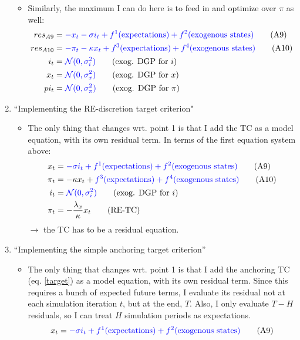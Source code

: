 \documentclass[11pt]{article}
\renewcommand{\[}{\begin{equation}}
\renewcommand{\]}{\end{equation}}
\begin{document}
\begin{enumerate}
\begin{itemize}
\item Similarly, the maximum I can do here is to feed in and optimize over $\pi$ as well:
\begin{align}
res_{A9}& = \textcolor{blue}{- x_t -\sigma i_t + f^1(\text{expectations}) + f^2(\text{exogenous states})} \tag{A9} \\
res_{A10}& =   \textcolor{blue}{-\pi_t  -\kappa x_t + f^3(\text{expectations}) + f^4(\text{exogenous states})} \tag{A10} \\
i_t & = \textcolor{blue}{\mathcal{N}(0,\sigma_i^2)} \tag{exog. DGP for $i$}\\
x_t & = \textcolor{blue}{\mathcal{N}(0,\sigma_x^2)} \tag{exog. DGP for $x$} \\
pi_t & = \textcolor{blue}{\mathcal{N}(0,\sigma_{\pi}^2)} \tag{exog. DGP for $\pi$}
\end{align}
\end{itemize}
\item ``Implementing the RE-discretion target criterion"
\begin{itemize}
\item The only thing that changes wrt. point 1 is that I add the TC as a model equation, with its own residual term. In terms of the first equation system above:
\begin{align}
x_t & = \textcolor{blue}{-\sigma i_t + f^1(\text{expectations}) + f^2(\text{exogenous states})} \tag{A9} \\
\pi_t & = -\kappa x_t + \textcolor{blue}{f^3(\text{expectations}) + f^4(\text{exogenous states})} \tag{A10} \\
i_t & = \textcolor{blue}{\mathcal{N}(0,\sigma_i^2)} \tag{exog. DGP for $i$} \\
\pi_t & = -\frac{\lambda_x}{\kappa} x_t \tag{RE-TC}
\end{align}
$\rightarrow$ the TC has to be a residual equation.
\end{itemize}
\item ``Implementing the simple anchoring target criterion''
\begin{itemize}
\item The only thing that changes wrt. point 1 is that I add the anchoring TC (eq. \ref{target}) as a model equation, with its own residual term. Since this requires a bunch of expected future terms, I evaluate its residual not at each simulation iteration $t$, but at the end, $T$. Also, I only evaluate $T-H$ residuals, so I can treat $H$ simulation periods as expectations.
\begin{align}
x_t & = \textcolor{blue}{-\sigma i_t + f^1(\text{expectations}) + f^2(\text{exogenous states})} \tag{A9} \\

\end{align}
\end{itemize}
\end{enumerate}
\end{document}
